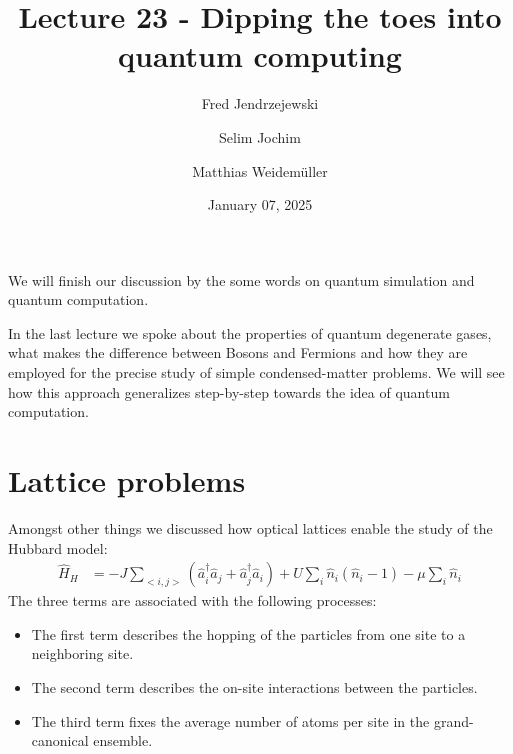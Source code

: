 \documentclass[10pt]{article}
\renewenvironment{abstract}
  {{\bfseries\noindent{\abstractname}\par\nobreak}\footnotesize}
  {\bigskip}
\begin{document}
\title{Lecture 23  - Dipping the toes into quantum computing}



\author[1]{Fred Jendrzejewski}%
\author[2]{Selim Jochim}%
\author[2]{Matthias Weidemüller}%
%
%


\vspace{-1em}



  
  \date{January 07, 2025}


\begingroup
\let\center\flushleft
\let\endcenter\endflushleft
\maketitle
\endgroup





\begin{abstract}
We will finish our discussion by the some words on quantum simulation and quantum computation.%
\end{abstract}%



\sloppy


In the last lecture  we spoke about the properties of quantum degenerate gases, what makes the difference between Bosons and Fermions and how they are employed for the precise study of simple condensed-matter problems. We will see how this approach generalizes step-by-step towards the idea of quantum computation.

\section{Lattice problems}
Amongst other things we discussed how optical lattices enable the study of the Hubbard model:
\begin{align}
\hat{H}_{H}&= -J \sum_{<i,j>} (\hat{a}^\dag_i \hat{a}_j +\hat{a}^\dag_j \hat{a}_i )+U\sum_i\hat{n}_i(\hat{n}_i-1)-\mu \sum_i \hat{n}_i
\end{align}
The three terms are associated with the following processes:
\begin{itemize}
\item The first term describes the hopping of the particles from one site to a neighboring site.
\item The second term describes the on-site interactions between the particles.
\item The third term fixes the average number of atoms per site in the grand-canonical ensemble.
\end{itemize}
\end{document}
